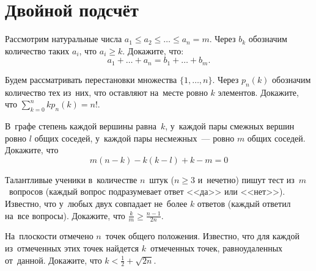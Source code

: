 
\section*{Двойной подсчёт}


\begin{problems}

\item
Рассмотрим натуральные числа
$a_1 \leq a_2 \leq \ldots \leq a_n = m$.
Через $b_k$ обозначим количество таких $a_i$, что $a_i \geq k$.
Докажите, что:
\[
    a_1 + \ldots + a_n = b_1 + \ldots + b_m
.\]

\item
Будем рассматривать перестановки множества $\{ 1, \ldots, n\}$.
Через $p_n(k)$ обозначим количество тех из~них, что оставляют на~месте ровно
$k$ элементов.
Докажите, что
\(
    \sum\limits_{k = 0}^n kp_n(k) = n!
\).

\item
В~графе степень каждой вершины равна~$k$, у~каждой пары смежных вершин
ровно $l$ общих соседей, у~каждой пары несмежных~--- ровно $m$ общих соседей.
Докажите, что
\[
    m (n - k) - k (k - l) + k - m = 0
\]

\item
Талантливые ученики в~количестве $n$~штук ($n \geq 3$ и~нечетно)
пишут тест из~$m$~вопросов
(каждый вопрос подразумевает ответ <<да>> или <<нет>>).
Известно, что у~любых двух совпадает не~более $k$ ответов
(каждый ответил на~все вопросы).
Докажите, что $\frac{k}{m} \geqslant \frac{n - 1}{2n}$.

\item
На~плоскости отмечено $n$~точек общего положения.
Известно, что для каждой из~отмеченных этих точек найдется $k$~отмеченных
точек, равноудаленных от~данной.
Докажите, что $k < \frac{1}{2} + \sqrt{2n}$.

\end{problems}

